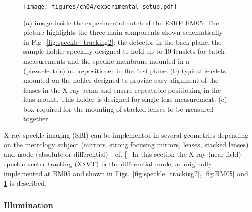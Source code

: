 \begin{refsection}
\begin{figure}[t]
        \centering
        {\texttt{[image: figures/ch04/experimental\_setup.pdf]}}
        \caption[Experimental setup at the BM05 beamline, ESRF.]{(a) image inside the experimental hutch of the ESRF BM05. The picture highlights the three main components shown schematically in Fig.~\ref{fig:speckle_tracking2}: the detector in the back-plane, the sample-holder specially designed to hold up to 10 lenslets for batch measurements and the speckle-membrane mounted in a (piezoelectric) nano-positioner in the first plane. (b) typical lenslets mounted on the holder designed to provide easy alignment of the lenses in the X-ray beam and ensure repeatable positioning in the lens mount. This holder is designed for single-lens measurement. (c) box required for the  mounting of stacked lenses to be measured together.} \label{fig:experimental_setup}
\end{figure}


X-ray speckle imaging (SBI) can be implemented in several geometries depending on the metrology subject (mirrors, strong focusing mirrors, lenses, stacked lenses) and mode (absolute or differential) - cf. [\cite{Berujon2020a}]. In this section the X-ray (near field) speckle vector tracking (XSVT) in the differential mode, as originally implemented at BM05 and shown in Figs.~\ref{fig:speckle_tracking2}, \ref{fig:BM05} and \ref{fig:experimental_setup} is described.

\subsubsection*{Illumination}


\end{refsection}
